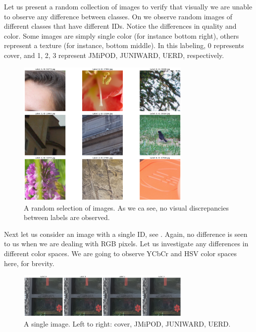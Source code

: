 \documentclass[letterpaper]{article}
\begin{document}
Let us present a random collection of images to verify that visually we are unable to observe any difference between classes. On  we observe random images of different classes that have different IDs. Notice the differences in quality and color. Some images are simply single color (for instance bottom right), others represent a texture (for instance, bottom middle). In this labeling, 0 represents cover, and 1, 2, 3 represent JMiPOD, JUNIWARD, UERD, respectively.


\begin{figure}
    \centering
    \includegraphics[width=0.75\textwidth]{random images.png}
    \caption{A random selection of images. As we ca see, no visual discrepancies between labels are observed.}
    \label{random}
\end{figure}

Next let us consider an image with a single ID, see . Again, no difference is seen to us when we are dealing with RGB pixels. Let us investigate any differences in different color spaces. We are going to observe YCbCr and HSV color spaces here, for brevity.

\begin{figure}
    \centering
    \includegraphics[width=0.75\textwidth]{four_images.png}
    \caption{A single image. Left to right: cover, JMiPOD, JUNIWARD, UERD.}
    \label{single}
\end{figure}
\end{document}
